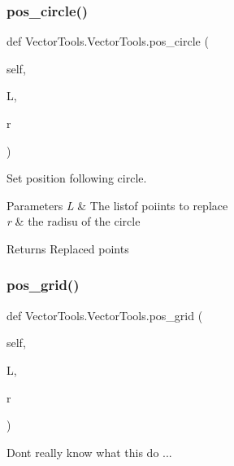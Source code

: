 \subsubsection{\texorpdfstring{pos\_circle()}{pos\_circle()}}
{\footnotesize\ttfamily def Vector\+Tools.\+Vector\+Tools.\+pos\+\_\+circle (\begin{DoxyParamCaption}\item[{}]{self,  }\item[{}]{L,  }\item[{}]{r }\end{DoxyParamCaption})}



Set position following circle. 


\begin{DoxyParams}{Parameters}
{\em L} & The listof poiints to replace \\
\hline
{\em r} & the radisu of the circle \\
\hline
\end{DoxyParams}
\begin{DoxyReturn}{Returns}
Replaced points 
\end{DoxyReturn}
\mbox{\label{classVectorTools_1_1VectorTools_a4f186cc997f45614592052b5ceaa16ec}} 
\subsubsection{\texorpdfstring{pos\_grid()}{pos\_grid()}}
{\footnotesize\ttfamily def Vector\+Tools.\+Vector\+Tools.\+pos\+\_\+grid (\begin{DoxyParamCaption}\item[{}]{self,  }\item[{}]{L,  }\item[{}]{r }\end{DoxyParamCaption})}



Don\textquotesingle{}t really know what this do ... 

\mbox{\label{classVectorTools_1_1VectorTools_a80fa6033e6c31745d3036f17dede3b88}} 
